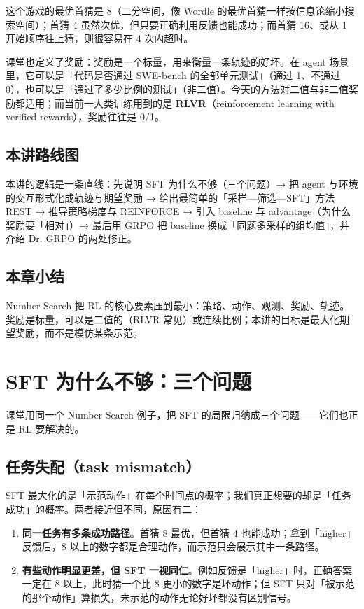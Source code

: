\documentclass[a4paper]{article}
\begin{document}
这个游戏的最优首猜是 8（二分空间，像 Wordle 的最优首猜一样按信息论缩小搜索空间）；首猜 4 虽然次优，但只要正确利用反馈也能成功；而首猜 16、或从 1 开始顺序往上猜，则很容易在 4 次内超时。

课堂也定义了奖励：奖励是一个标量，用来衡量一条轨迹的好坏。在 agent 场景里，它可以是「代码是否通过 SWE-bench 的全部单元测试」（通过 1、不通过 0），也可以是「通过了多少比例的测试」（非二值）。今天的方法对二值与非二值奖励都适用；而当前一大类训练用到的是 \textbf{RLVR}（reinforcement learning with verified rewards），奖励往往是 0/1。

\subsection{本讲路线图}

本讲的逻辑是一条直线：先说明 SFT 为什么不够（三个问题）→ 把 agent 与环境的交互形式化成轨迹与期望奖励 → 给出最简单的「采样—筛选—SFT」方法 REST → 推导策略梯度与 REINFORCE → 引入 baseline 与 advantage（为什么奖励要「相对」）→ 最后用 GRPO 把 baseline 换成「同题多采样的组均值」，并介绍 Dr. GRPO 的两处修正。

\subsection{本章小结}
Number Search 把 RL 的核心要素压到最小：策略、动作、观测、奖励、轨迹。奖励是标量，可以是二值的（RLVR 常见）或连续比例；本讲的目标是最大化期望奖励，而不是模仿某条示范。

\section{SFT 为什么不够：三个问题}

课堂用同一个 Number Search 例子，把 SFT 的局限归纳成三个问题——它们也正是 RL 要解决的。

\subsection{任务失配（task mismatch）}

SFT 最大化的是「示范动作」在每个时间点的概率；我们真正想要的却是「任务成功」的概率。两者接近但不同，原因有二：

\begin{enumerate}
\item \textbf{同一任务有多条成功路径}。首猜 8 最优，但首猜 4 也能成功；拿到「higher」反馈后，8 以上的数字都是合理动作，而示范只会展示其中一条路径。
\item \textbf{有些动作明显更差，但 SFT 一视同仁}。例如反馈是「higher」时，正确答案一定在 8 以上，此时猜一个比 8 更小的数字是坏动作；但 SFT 只对「被示范的那个动作」算损失，未示范的动作无论好坏都没有区别信号。
\end{enumerate}
\end{document}
